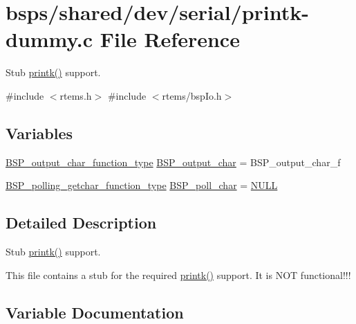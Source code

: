 \hypertarget{printk-dummy_8c}{}\section{bsps/shared/dev/serial/printk-\/dummy.c File Reference}
\label{printk-dummy_8c}


Stub \mbox{\hyperlink{bspIo_8h_a380cfecc8035cec8a13b68c0cb90f32f}{printk()}} support.  


{\ttfamily \#include $<$rtems.\+h$>$}\newline
{\ttfamily \#include $<$rtems/bsp\+Io.\+h$>$}\newline
\subsection*{Variables}
\begin{DoxyCompactItemize}
\item 
\mbox{\hyperlink{bspIo_8h_a0b0dff1c3d35110ae303b4098c60dc14}{B\+S\+P\+\_\+output\+\_\+char\+\_\+function\+\_\+type}} \mbox{\hyperlink{printk-dummy_8c_a5fb8c9c4f076f0340b4a17ed432ced5c}{B\+S\+P\+\_\+output\+\_\+char}} = B\+S\+P\+\_\+output\+\_\+char\+\_\+f
\item 
\mbox{\hyperlink{bspIo_8h_a132b9ceff428a634ece5dfaac7ef1006}{B\+S\+P\+\_\+polling\+\_\+getchar\+\_\+function\+\_\+type}} \mbox{\hyperlink{printk-dummy_8c_ae5846eecdfa8f2813504371bf01c29b0}{B\+S\+P\+\_\+poll\+\_\+char}} = \mbox{\hyperlink{bestcomm__api_8h_a872bb74de61c3689ccd5b41873fce42c}{N\+U\+LL}}
\end{DoxyCompactItemize}


\subsection{Detailed Description}
Stub \mbox{\hyperlink{bspIo_8h_a380cfecc8035cec8a13b68c0cb90f32f}{printk()}} support. 

This file contains a stub for the required \mbox{\hyperlink{bspIo_8h_a380cfecc8035cec8a13b68c0cb90f32f}{printk()}} support. It is N\+OT functional!!! 

\subsection{Variable Documentation}
\mbox{\label{printk-dummy_8c_a5fb8c9c4f076f0340b4a17ed432ced5c}} 
